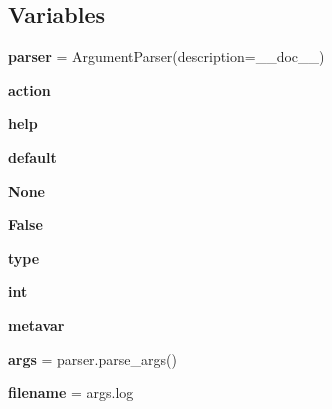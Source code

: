 \subsection*{Variables}
\begin{DoxyCompactItemize}
\item 
\mbox{\label{namespacepymavlink_1_1tools_1_1mavplayback_ac18db8fa1ca9b23e48f60e5e96e4c551}} 
{\bfseries parser} = Argument\+Parser(description=\+\_\+\+\_\+doc\+\_\+\+\_\+)
\item 
\mbox{\label{namespacepymavlink_1_1tools_1_1mavplayback_a063a8847000068f7337569448c8c6b48}} 
{\bfseries action}
\item 
\mbox{\label{namespacepymavlink_1_1tools_1_1mavplayback_a8188722149f5a81a20277678c5554d6d}} 
{\bfseries help}
\item 
\mbox{\label{namespacepymavlink_1_1tools_1_1mavplayback_a645394812a210b9b5d327607febb11ea}} 
{\bfseries default}
\item 
\mbox{\label{namespacepymavlink_1_1tools_1_1mavplayback_a5b798e76cda40436a3cbf633017fa0b6}} 
{\bfseries None}
\item 
\mbox{\label{namespacepymavlink_1_1tools_1_1mavplayback_aa3d711ba88bb2b2ba84a0b2ad98a0b91}} 
{\bfseries False}
\item 
\mbox{\label{namespacepymavlink_1_1tools_1_1mavplayback_a42b5bf06ac5152039a7d8135d608857c}} 
{\bfseries type}
\item 
\mbox{\label{namespacepymavlink_1_1tools_1_1mavplayback_a1b85b4d0a9c939c3ec13ea9220f17bcb}} 
{\bfseries int}
\item 
\mbox{\label{namespacepymavlink_1_1tools_1_1mavplayback_a87ff6cc4cad7b8bd103cc2fe7e94f23c}} 
{\bfseries metavar}
\item 
\mbox{\label{namespacepymavlink_1_1tools_1_1mavplayback_ac755476787f4f8e494b02d8584a81c6b}} 
{\bfseries args} = parser.\+parse\+\_\+args()
\item 
\mbox{\label{namespacepymavlink_1_1tools_1_1mavplayback_af58db67c35618bb32480880bf6cc83d3}} 
{\bfseries filename} = args.\+log
\end{DoxyCompactItemize}


